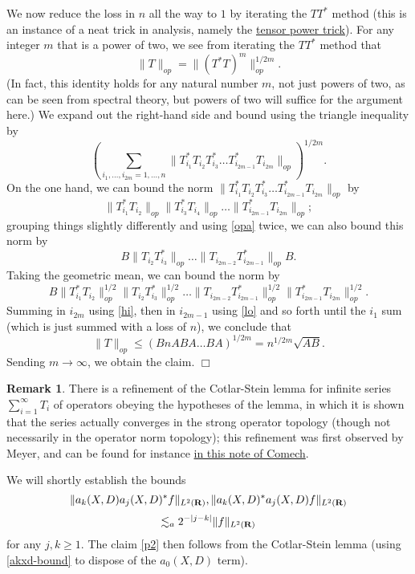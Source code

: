 \documentclass[11pt]{article}
\theoremstyle{definition}
\newtheorem{remark}[theorem]{Remark}
\begin{document}
We now reduce the loss in \({n}\) all the way to \({1}\) by iterating the \({TT^*}\) method (this is an instance of a neat trick in analysis, namely the \href{https://terrytao.wordpress.com/2008/08/25/tricks-wiki-article-the-tensor-product-trick/}{tensor power trick}). For any integer \({m}\) that is a power of two, we see from iterating the \({TT^*}\) method that 
\[\displaystyle  \| T \|_{op} = \| (T^* T)^m \|_{op}^{1/2m}.\]
 (In fact, this identity holds for any natural number \({m}\), not just powers of two, as can be seen from spectral theory, but powers of two will suffice for the argument here.) We expand out the right-hand side and bound using the triangle inequality by 
\[\displaystyle  (\sum_{i_1,\dots,i_{2m} = 1,\dots,n} \| T^*_{i_1} T_{i_2} T^*_{i_3} \dots T^*_{i_{2m-1}} T_{i_{2m}} \|_{op})^{1/2m}.\]
 On the one hand, we can bound the norm \({\| T^*_{i_1} T_{i_2} T^*_{i_3} \dots T^*_{i_{2m-1}} T_{i_{2m}} \|_{op}}\) by 
\[\displaystyle  \| T^*_{i_1} T_{i_2} \|_{op} \| T^*_{i_3} T_{i_4} \|_{op} \dots \| T^*_{i_{2m-1}} T_{i_{2m}} \|_{op};\]
 grouping things slightly differently and using \eqref{opa} twice, we can also bound this norm by 
\[\displaystyle  B \| T_{i_2} T^*_{i_3} \|_{op} \dots \| T_{i_{2m-2}} T^*_{i_{2m-1}} \|_{op} B.\]
 Taking the geometric mean, we can bound the norm by 
\[\displaystyle B \| T^*_{i_1} T_{i_2} \|_{op}^{1/2} \| T_{i_2} T^*_{i_3} \|_{op}^{1/2} \dots \| T_{i_{2m-2}} T^*_{i_{2m-1}} \|_{op}^{1/2} \| T^*_{i_{2m-1}} T_{i_{2m}} \|_{op}^{1/2}.\]
 Summing in \({i_{2m}}\) using \eqref{hi}, then in \({i_{2m-1}}\) using \eqref{lo} and so forth until the \({i_1}\) sum (which is just summed with a loss of \({n}\)), we conclude that 
\[\displaystyle  \|T\|_{op} \leq (B n A B A \dots B A)^{1/2m} = n^{1/2m} \sqrt{AB}.\]
 Sending \({m \rightarrow \infty}\), we obtain the claim. \(\Box\)
\begin{remark}
  There is a refinement of the Cotlar-Stein lemma for infinite series \({\sum_{i=1}^\infty T_i}\) of operators obeying the hypotheses of the lemma, in which it is shown that the series actually converges in the strong operator topology (though not necessarily in the operator norm topology); this refinement was first observed by Meyer, and can be found for instance \href{https://www.math.tamu.edu/~comech/papers/CotlarStein/CotlarStein.pdf}{in this note of Comech}. 
\end{remark}

We will shortly establish the bounds 
\[\displaystyle  \| a_k(X,D) a_j(X,D)^* f\|_{L^2({\bf R})}, \| a_k(X,D)^* a_j(X,D) f\|_{L^2({\bf R})} \]
\[\displaystyle \lesssim_{a} 2^{-|j-k|} \|f\|_{L^2({\bf R})}\]
 for any \({j,k \geq 1}\). The claim \eqref{p2} then follows from the Cotlar-Stein lemma (using \eqref{akxd-bound} to dispose of the \({a_0(X,D)}\) term).
\end{document}
